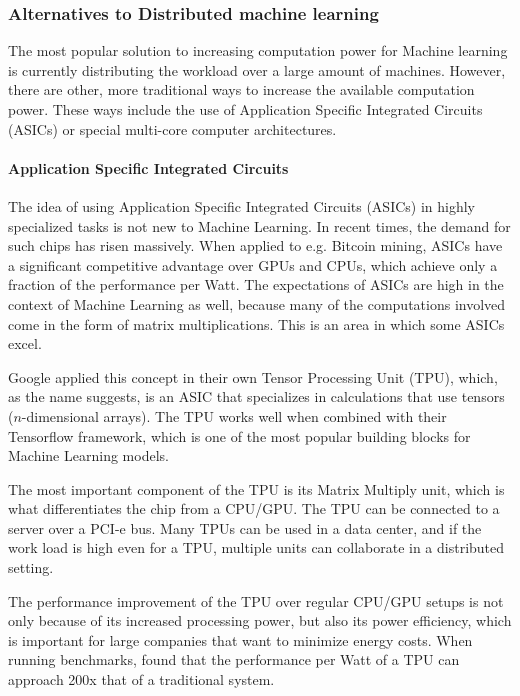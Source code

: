 
\subsubsection{Alternatives to Distributed machine learning}
The most popular solution to increasing computation power for Machine
learning is currently distributing the workload over a large amount of machines. However, there are other, more traditional ways to increase the available computation power. These ways include the use of Application Specific Integrated Circuits (ASICs) or special multi-core computer architectures.

\paragraph{Application Specific Integrated Circuits}
The idea of using Application Specific Integrated Circuits (ASICs) in highly specialized tasks is not new to Machine Learning. In recent times, the demand for such chips has risen massively\cite{Metz18}.
When applied to e.g. Bitcoin mining, ASICs have a significant competitive advantage over GPUs and CPUs, which achieve only a fraction of the performance per Watt. The expectations of ASICs are high in the context of Machine Learning as well, because many of the computations involved come in the form of matrix multiplications. This is an area in which some ASICs excel.

Google applied this concept in their own Tensor Processing Unit (TPU)\cite{Sato17}, which, as the name suggests, is an ASIC that specializes in calculations that use tensors ($n$-dimensional arrays). The TPU works well when combined with their Tensorflow\cite{Tensorflow2015}\cite{Tensorflow2016} framework, which is one of the most popular building blocks for Machine Learning models.

The most important component of the TPU is its Matrix Multiply unit, which is what differentiates the chip from a CPU/GPU. The TPU can be connected to a server over a PCI-e bus. Many TPUs can be used in a data center, and if the work load is high even for a TPU, multiple units can collaborate in a distributed setting.

The performance improvement of the TPU over regular CPU/GPU setups is not only because of its increased processing power, but also its power efficiency, which is important for large companies that want to minimize energy costs. When running benchmarks, \citet{Joup17} found that the performance per Watt of a TPU can approach 200x that of a traditional system.

